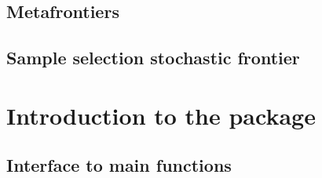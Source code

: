 \documentclass[nojss]{jss}
\begin{document}
\subsection{Metafrontiers}

\subsection{Sample selection stochastic frontier} \label{subsec:ss}


\section[Introduction to the sfaR package]{Introduction to the  package} \label{sec:prespackage}

\subsection{Interface to main functions}
\end{document}
